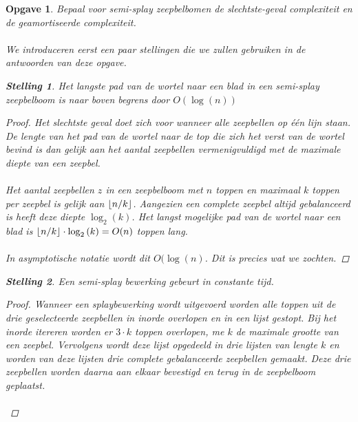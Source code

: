 \documentclass[12pt,hidelinks]{article}
\DeclarePairedDelimiter\floor{\lfloor}{\rfloor}
\newtheorem{opgave}{Opgave}
\newtheorem{stelling}{Stelling}
\begin{document}
    \begin{opgave}
        Bepaal voor semi-splay zeepbelbomen de slechtste-geval complexiteit en de geamortiseerde complexiteit.
        \\ \\ \normalfont
        We introduceren eerst een paar stellingen die we zullen gebruiken in de antwoorden van deze opgave.
        \begin{stelling}Het langste pad van de wortel naar een blad in een semi-splay zeepbelboom is naar boven begrens door $O(\log(n))$ \label{stelling1}
            \begin{proof}Het slechtste geval doet zich voor wanneer alle zeepbellen op één lijn staan.
                De lengte van het pad van de wortel naar de top die zich het verst van de wortel bevind is dan gelijk aan het aantal zeepbellen vermenigvuldigd met de maximale diepte van een zeepbel.
                \\
                \\
                Het aantal zeepbellen $z$ in een zeepbelboom met $n$ toppen en maximaal $k$ toppen per zeepbel is gelijk aan $\floor{n/k}$.
                Aangezien een complete zeepbel altijd gebalanceerd is heeft deze diepte $\log_2{(k)}$. 
                Het langst mogelijke pad van de wortel naar een blad is $\floor{n/k}\cdot\log_2{(k)} = O(n)$ toppen lang.
                \\
                \\
                In asymptotische notatie wordt dit $O(\log(n)$. Dit is precies wat we zochten.
            \end{proof}
        \end{stelling}
        \begin{stelling} Een semi-splay bewerking gebeurt in constante tijd. \label{stelling2}
            \begin{proof}
                Wanneer een splaybewerking wordt uitgevoerd worden alle toppen uit de drie geselecteerde zeepbellen in inorde overlopen en in een lijst gestopt.
                Bij het inorde itereren worden er $3\cdot k$ toppen overlopen, me $k$ de maximale grootte van een zeepbel.
                Vervolgens wordt deze lijst opgedeeld in drie lijsten van lengte $k$ en worden van deze lijsten drie complete gebalanceerde zeepbellen gemaakt.
                Deze drie zeepbellen worden daarna aan elkaar bevestigd en terug in de zeepbelboom geplaatst.
                \\
                \\

\end{proof}
\end{stelling}
\end{opgave}
\end{document}
